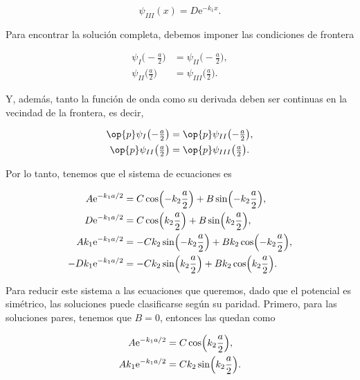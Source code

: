 \documentclass[../main.tex]{subfiles}
\begin{document}
\begin{problema}
\begin{itemize}
		      \begin{equation*}
			      \psi_{III}(x) = D \mathrm{e}^{-k_{1}x}.
		      \end{equation*}
	\end{itemize}

	Para encontrar la solución completa, debemos imponer las condiciones de frontera

	\begin{align*}
		\psi_{I}\bigl(-\tfrac{a}{2}\bigr) & = \psi_{II}\bigl(-\tfrac{a}{2}\bigr), \\
		\psi_{II}\bigl(\tfrac{a}{2}\bigr) & = \psi_{III}\bigl(\tfrac{a}{2}\bigr).
	\end{align*}

	Y, además, tanto la función de onda como su derivada deben ser continuas en la vecindad
	de la frontera, es decir,

	\begin{align*}
		\op{p}\psi_{I}\bigl(-\tfrac{a}{2}\bigr) & = \op{p}\psi_{II}\bigl(-\tfrac{a}{2}\bigr), \\
		\op{p}\psi_{II}\bigl(\tfrac{a}{2}\bigr) & = \op{p}\psi_{III}\bigl(\tfrac{a}{2}\bigr).
	\end{align*}

	Por lo tanto, tenemos que el sistema de ecuaciones es

	\begin{align}
		A \mathrm{e}^{-k_{1}a/2}      & = C \cos\Bigl(-k_{2}\dfrac{a}{2}\Bigr) + B \sin\Bigl(-k_{2}\dfrac{a}{2}\Bigr),\label{eq:psi_neg}         \\
		D \mathrm{e}^{-k_{1}a/2}      & = C \cos\Bigl(k_{2}\dfrac{a}{2}\Bigr) + B \sin\Bigl(k_{2}\dfrac{a}{2}\Bigr),\label{eq:psi_pos}           \\
		Ak_{1}\mathrm{e}^{-k_{1}a/2}  & = -Ck_{2}\sin\Bigl(-k_{2}\dfrac{a}{2}\Bigr) + Bk_{2}\cos\Bigl(-k_{2}\dfrac{a}{2}\Bigr),\label{eq:dv_neg} \\
		-Dk_{1}\mathrm{e}^{-k_{1}a/2} & = -Ck_{2}\sin\Bigl(k_{2}\dfrac{a}{2}\Bigr) + Bk_{2}\cos\Bigl(k_{2}\dfrac{a}{2}\Bigr)\label{eq:dv_pos}.
	\end{align}

	Para reducir este sistema a las ecuaciones que queremos, dado que el
	potencial es simétrico, las soluciones puede clasificarse según su
	paridad. Primero, para las soluciones pares, tenemos que \(B = 0\),
	entonces las  quedan como

	\begin{align}
		A \mathrm{e}^{-k_{1}a/2}     & = C \cos\Bigl(k_{2}\dfrac{a}{2}\Bigr),\label{eq:even_psi_neg}    \\
		Ak_{1}\mathrm{e}^{-k_{1}a/2} & = Ck_{2}\sin\Bigl(k_{2}\dfrac{a}{2}\Bigr).\label{eq:even_dv_neg}
	\end{align}


\end{problema}
\end{document}
